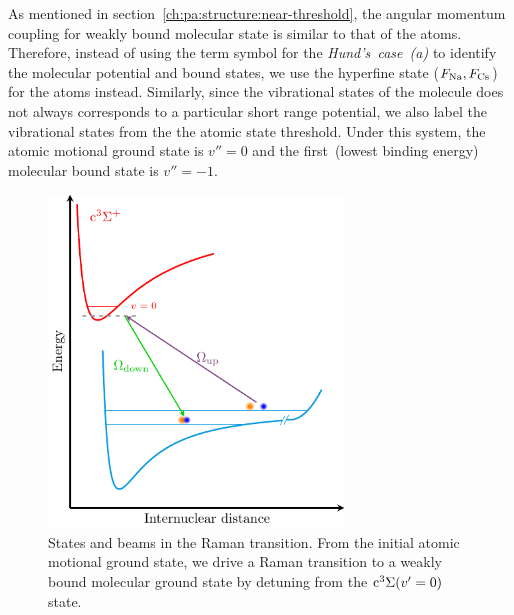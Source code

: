 As mentioned in section~\ref{ch:pa:structure:near-threshold},
the angular momentum coupling for weakly bound molecular state is similar to that of the atoms.
Therefore, instead of using the term symbol for the \textit{Hund's~case~(a)}
to identify the molecular potential and bound states,
we use the hyperfine state ($F_{\mathrm{Na}}, F_{\mathrm{Cs}}$) for the atoms instead.
Similarly, since the vibrational states of the molecule does not always corresponds to
a particular short range potential, we also label the vibrational states
from the the atomic state threshold.
Under this system, the atomic motional ground state is $v''=0$ and
the first~(lowest binding energy) molecular bound state is $v''=-1$.

\begin{figure}
  \centering
  \includegraphics[width=0.7\textwidth]{figures/raman_spectroscopy_scheme.pdf}
  \caption[Raman transition energy diagram]{
    States and beams in the Raman transition.
    From the initial atomic motional ground state,
    we drive a Raman transition to a weakly bound molecular ground state
    by detuning from the $\mathrm{c^3\Sigma}{\left({v'=0}\right)}$ state.
    \label{fig:raman-spectroscopy:scheme}}
\end{figure}

